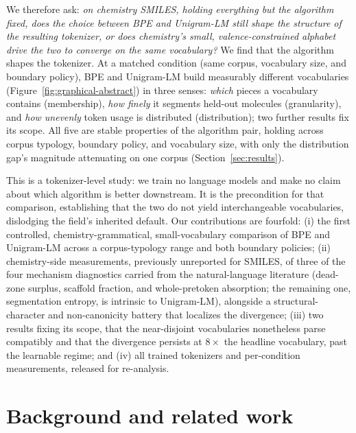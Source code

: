\documentclass{article}
\begin{document}
We therefore ask: \emph{on chemistry SMILES, holding everything but the
algorithm fixed, does the choice between BPE and Unigram-LM still shape the
structure of the resulting tokenizer, or does chemistry's small,
valence-constrained alphabet drive the two to converge on the same
vocabulary?} We find that the algorithm shapes the tokenizer. At a matched
condition (same corpus, vocabulary size, and boundary policy), BPE and Unigram-LM
build measurably different vocabularies (Figure~\ref{fig:graphical-abstract}) in
three senses: \emph{which} pieces a
vocabulary contains (membership), \emph{how finely} it segments held-out
molecules (granularity), and \emph{how unevenly} token usage is distributed
(distribution); two further results fix its scope. All five
are stable properties of the algorithm pair, holding across corpus typology,
boundary policy, and vocabulary size, with only the distribution gap's magnitude
attenuating on one corpus (Section~\ref{sec:results}).

This is a tokenizer-level study: we train no language models and make no claim
about which algorithm is better downstream. It is the precondition for that
comparison, establishing that the two do not yield interchangeable vocabularies,
dislodging the field's inherited default. Our
contributions are fourfold:
(i) the first controlled,
chemistry-grammatical, small-vocabulary comparison of BPE and Unigram-LM
across a corpus-typology range and both boundary policies; (ii)
chemistry-side measurements, previously unreported for SMILES, of three of the
four mechanism diagnostics carried
from the natural-language literature (dead-zone surplus, scaffold fraction, and
whole-pretoken absorption; the remaining one, segmentation entropy, is intrinsic to
Unigram-LM),
alongside a structural-character and non-canonicity battery that localizes the
divergence; (iii) two results fixing its scope, that the near-disjoint
vocabularies nonetheless parse compatibly and that the divergence persists at
$8\times$ the headline vocabulary, past the learnable regime; and
(iv) all trained tokenizers and per-condition measurements, released for
re-analysis.

\section{Background and related work}\label{sec:background}
\end{document}
